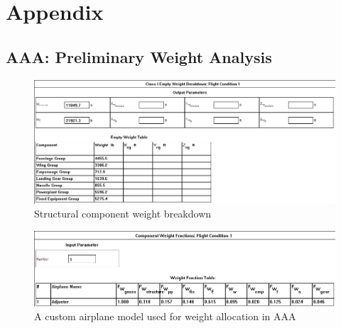 \documentclass[conf]{new-aiaa}
\begin{document}
\begin{thebibliography}{99}


\end{thebibliography}

\section{Appendix}

\subsection{AAA: Preliminary Weight Analysis}
\begin{figure}[H]
    \includegraphics[width=\textwidth]{Report3Printouts/Weight/ComponentWeights_cropped.png}
    \caption{Structural component weight breakdown}
    \label{fig:componentweights}
\end{figure}

\begin{figure}[H]
    \includegraphics[width=\textwidth]{Report3Printouts/Weight/CustomAirplane_cropped.png}
    \caption{A custom airplane model used for weight allocation in AAA}
    \label{fig:customairplane}
\end{figure}
\end{document}
